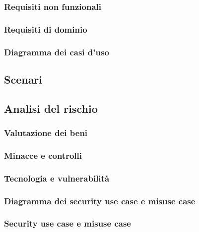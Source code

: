 \documentclass{article}
\begin{document}
\subsubsection{Requisiti non funzionali}

\subsubsection{Requisiti di dominio}

\subsubsection{Diagramma dei casi d'uso}


\subsection{Scenari}


\subsection{Analisi del rischio}
\subsubsection{Valutazione dei beni}

\subsubsection{Minacce e controlli}

\subsubsection{Tecnologia e vulnerabilità}

\subsubsection{Diagramma dei security use case e misuse case}

\subsubsection{Security use case e misuse case}

\end{document}
